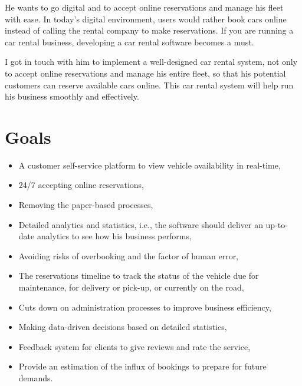 \documentclass{article}
\begin{document}
        \vspace{0.3cm}
        
        He wants to go digital and to accept online reservations and manage his fleet with ease. In today’s digital environment, users would rather book cars online instead of calling the rental company to make reservations. If you are running a car rental business, developing a car rental software becomes a must. 
        
        \vspace{0.3cm}
        
        I got in touch with him to implement a well-designed car rental system, not only to accept online reservations and manage his entire fleet, so that his potential customers can reserve available cars online. This car rental system will help run his business smoothly and effectively.

\section{Goals}

  \begin{itemize}
  
	    \item A customer self-service platform to view vehicle              availability in real-time,
	    \item 24/7 accepting online reservations,
	    \item Removing the paper-based processes,
	    \item Detailed analytics and statistics, i.e., the software should deliver an up-to-date analytics to see how his business performs,
	    \item Avoiding risks of overbooking and the factor of          human error,
	    \item The reservations timeline to track the status of the vehicle due for maintenance, for delivery or pick-up, or currently on the road,
	    \item Cuts down on administration processes to improve         business efficiency,
	    \item Making data-driven decisions based on detailed           statistics,
	   \item Feedback system for clients to give reviews and rate the service,
	   \item Provide an estimation of the influx of bookings to prepare for future demands.
	   
	 \end{itemize}
\end{document}
